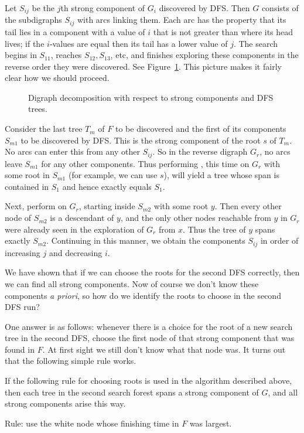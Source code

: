 Let $S_{ij}$ be the $j$th strong component of $G_i$ discovered by
DFS. Then $G$ consists of the subdigraphs $S_{ij}$ with arcs linking
them. Each arc has the property that its tail lies in  a component
with a value of $i$ that is not greater than where its head lives;
if the $i$-values are equal then its tail has a lower value of $j$.
The search begins in $S_{11}$, reaches $S_{12}, S_{13}$, etc, and finishes
exploring these components in the reverse order they were discovered. See
Figure~\ref{fig:scc-alg1}. This picture makes it fairly clear how we
should proceed.

\begin{figure}

\caption{Digraph decomposition with respect to strong components and DFS
trees.}
\label{fig:scc-alg1}
\end{figure}

Consider the last tree $T_m$ of $F$ to be discovered and the first
of its components $S_{m1}$ to be discovered by DFS. This is the strong
component of the root $s$ of $T_m$. No arcs can enter this from any other
$S_{ij}$. So in the reverse digraph $G_r$, no arcs leave $S_{m1}$ for any
other components. Thus performing , this time on $G_r$
with some root in $S_{m1}$ (for example, we can use $s$), will yield a
tree whose span is contained in $S_1$ and hence  exactly equals $S_1$.

Next, perform  on $G_r$, starting inside $S_{m2}$ with
some root $y$. Then every other node of $S_{m2}$ is a descendant of $y$,
and the only other nodes reachable from $y$ in $G_r$ were already seen
in the exploration of $G_r$ from $x$. Thus the tree of $y$ spans exactly
$S_{m2}$. Continuing in this manner, we obtain the components $S_{ij}$
in order of increasing $j$ and decreasing $i$.

We have shown that if we can choose the roots for the second DFS
correctly, then we can find all strong components. Now of course we
don't know these components \emph{a priori}, so how do we identify the
roots to choose in the second DFS run?

One answer is as follows: whenever there is a choice for the root of a
new search tree in the second DFS, choose the first node of that strong
component that was found in $F$. At first sight we still don't know what
that node was.  It turns out that the following simple rule works.

\begin{Theorem} \label{thm:scc-alg} 
If the following rule for choosing
roots is used in the algorithm described above, then each tree in the
second search forest spans a strong component of $G$, and all strong
components arise this way.

Rule: use the white node whose finishing time in $F$ was largest.

\end{Theorem}

